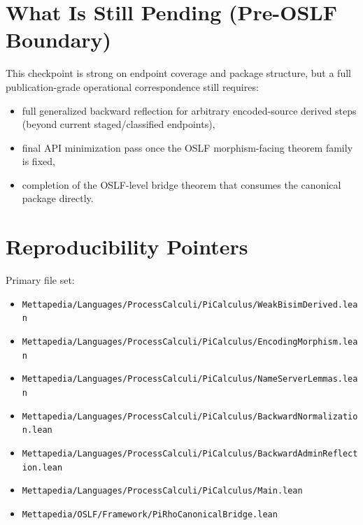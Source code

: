 \documentclass[11pt]{article}
\begin{document}
\section{What Is Still Pending (Pre-OSLF Boundary)}
This checkpoint is strong on endpoint coverage and package structure, but a full publication-grade operational correspondence still requires:
\begin{itemize}
  \item full generalized backward reflection for arbitrary encoded-source derived steps (beyond current staged/classified endpoints),
  \item final API minimization pass once the OSLF morphism-facing theorem family is fixed,
  \item completion of the OSLF-level bridge theorem that consumes the canonical package directly.
\end{itemize}

\section*{Reproducibility Pointers}
Primary file set:
\begin{itemize}
  \item \texttt{Mettapedia/Languages/ProcessCalculi/PiCalculus/WeakBisimDerived.lean}
  \item \texttt{Mettapedia/Languages/ProcessCalculi/PiCalculus/EncodingMorphism.lean}
  \item \texttt{Mettapedia/Languages/ProcessCalculi/PiCalculus/NameServerLemmas.lean}
  \item \texttt{Mettapedia/Languages/ProcessCalculi/PiCalculus/BackwardNormalization.lean}
  \item \texttt{Mettapedia/Languages/ProcessCalculi/PiCalculus/BackwardAdminReflection.lean}
  \item \texttt{Mettapedia/Languages/ProcessCalculi/PiCalculus/Main.lean}
  \item \texttt{Mettapedia/OSLF/Framework/PiRhoCanonicalBridge.lean}
\end{itemize}
\end{document}
